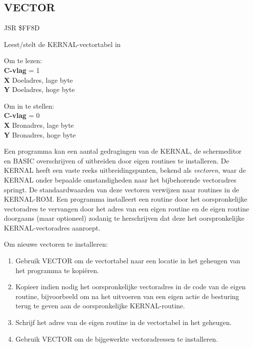 \subsection{VECTOR}
\label{KERNAL Jump Table!VECTOR}
\begin{description}[leftmargin=2cm,style=nextline]
    \item [Adres:] JSR \$FF8D    \item [Omschrijving:] Leest/stelt de KERNAL-vectortabel in    \item [Invoer:]        Om te lezen: \\        \textbf{C-vlag} = 1 \\        \textbf{X} Doeladres, lage byte \\        \textbf{Y} Doeladres, hoge byte

        Om in te stellen: \\        \textbf{C-vlag} = 0 \\        \textbf{X} Bronadres, lage byte \\        \textbf{Y} Bronadres, hoge byte

    \item [Opmerkingen:]        Een programma kan een aantal gedragingen van de KERNAL, de schermeditor en BASIC overschrijven of uitbreiden door eigen routines te installeren. De KERNAL heeft een vaste reeks uitbreidingspunten, bekend als \emph{vectoren}, waar de KERNAL onder bepaalde omstandigheden naar het bijbehorende vectoradres springt. De standaardwaarden van deze vectoren verwijzen naar routines in de KERNAL-ROM. Een programma installeert een routine door het oorspronkelijke vectoradres te vervangen door het adres van een eigen routine en de eigen routine doorgaans (maar optioneel) zodanig te herschrijven dat deze het oorspronkelijke KERNAL-vectoradres aanroept.

        Om nieuwe vectoren te installeren:

        \begin{enumerate}
            \item Gebruik VECTOR om de vectortabel naar een locatie in het geheugen van het programma te kopiëren.            \item Kopieer indien nodig het oorspronkelijke vectoradres in de code van de eigen routine, bijvoorbeeld om na het uitvoeren van een eigen actie de besturing terug te geven aan de oorspronkelijke KERNAL-routine.            \item Schrijf het adres van de eigen routine in de vectortabel in het geheugen.            \item Gebruik VECTOR om de bijgewerkte vectoradressen te installeren.
        \end{enumerate}


\end{description}
